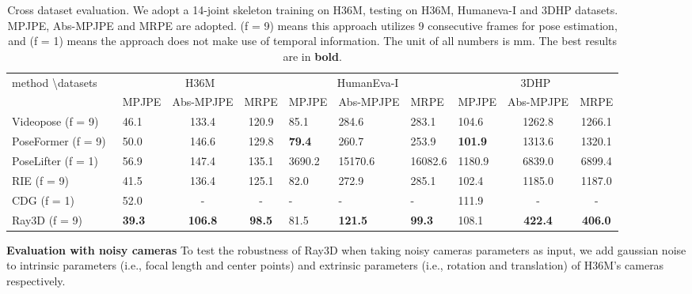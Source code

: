 \documentclass[10pt,twocolumn,letterpaper]{article}
\begin{document}
\begin{table*}[htbp]
\caption{Cross dataset evaluation. We adopt a 14-joint skeleton training on H36M, testing on H36M, Humaneva-I and 3DHP datasets.
MPJPE, Abs-MPJPE and MRPE are adopted. (f = 9) means this approach utilizes 9 consecutive frames for pose estimation, and (f = 1) means the approach does not make use of temporal information. The unit of all numbers is mm. The best results are in \textbf{bold}.}
\centering
\small
\begin{tabular}{@{}l|lcc|lll|lcc@{}}
\toprule
method \textbackslash datasets & \multicolumn{3}{c|}{H36M} & \multicolumn{3}{c|}{HumanEva-I} & \multicolumn{3}{c}{3DHP} \\
                                                        & MPJPE  & Abs-MPJPE  & MRPE   & MPJPE  & Abs-MPJPE  & MRPE    & MPJPE          & Abs-MPJPE  & MRPE   \\  \midrule
Videopose (f = 9)~\cite{dario2019videopose}             & 46.1   & 133.4      & 120.9  & 85.1   & 284.6      & 283.1   & 104.6          & 1262.8     & 1266.1 \\
PoseFormer (f = 9)~\cite{ce2021poseformer}              & 50.0   & 146.6      & 129.8  & \textbf{79.4}   & 260.7      & 253.9   & \textbf{101.9}          & 1313.6     & 1320.1 \\
PoseLifter (f = 1)~\cite{ju2019absposelifter}           & 56.9   & 147.4      & 135.1  & 3690.2 & 15170.6    & 16082.6 & 1180.9         & 6839.0     & 6899.4 \\
RIE (f = 9)~\cite{wenkang2021improving}                 & 41.5   & 136.4      & 125.1  & 82.0   & 272.9      & 285.1   & 102.4          & 1185.0     & 1187.0 \\
CDG (f = 1) ~\cite{WangSF20} & 52.0 & - & - & - & - & - & 111.9 & - & - \\
Ray3D (f = 9)                                          & \textbf{39.3}   & \textbf{106.8}      & \textbf{98.5}   & 81.5   & \textbf{121.5}      & \textbf{99.3}    & 108.1          & \textbf{422.4}      & \textbf{406.0}  \\ \bottomrule
\end{tabular}
\label{table:supp_result_4}
\end{table*}

\noindent\textbf{Evaluation with noisy cameras} To test the robustness of Ray3D when taking noisy cameras parameters as input, we add gaussian noise to intrinsic parameters (i.e., focal length and center points) and extrinsic parameters (i.e., rotation and translation) of H36M's cameras respectively.
\end{document}
